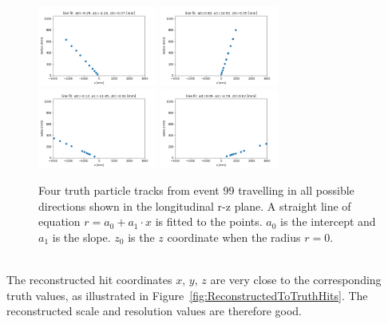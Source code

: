 \begin{figure}[htb]
\centering
\includegraphics[width=0.35\textwidth]{plots/particle_553945090628780032_r_vs_z.png}
\includegraphics[width=0.35\textwidth]{plots/particle_540433329673994240_r_vs_z.png}\\
\includegraphics[width=0.35\textwidth]{plots/particle_94575729613733888_r_vs_z.png}
\includegraphics[width=0.35\textwidth]{plots/particle_99081047228022784_r_vs_z.png}
\caption{Four truth particle tracks from event 99 travelling in all possible directions shown in the longitudinal r-z plane. A straight line of equation $r = a_0 + a_1 \cdot x$ is fitted to the points. $a_0$ is the intercept and $a_1$ is the slope. $z_0$ is the $z$ coordinate when the radius $r=0$.}
\label{fig:TruthParticleTracks}
\end{figure}

\ \\The reconstructed hit coordinates $x$, $y$, $z$ are very close to the corresponding truth values, as illustrated in Figure~\ref{fig:ReconstructedToTruthHits}. The reconstructed scale and resolution values are therefore good. 

